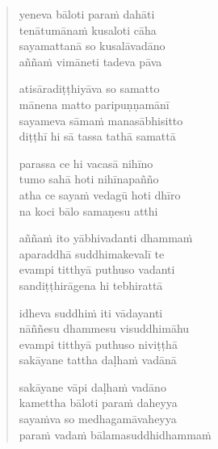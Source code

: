 \clearpage
\begin{verse}

yeneva bāloti paraṁ dahāti\\
tenātumānaṁ kusaloti cāha\\
sayamattanā so kusalāvadāno\\
aññaṁ vimāneti tadeva pāva

atisāradiṭṭhiyāva so samatto\\
mānena matto paripuṇṇamānī\\
sayameva sāmaṁ manasābhisitto\\
diṭṭhī hi sā tassa tathā samattā

parassa ce hi vacasā nihīno\\
tumo sahā hoti nihīnapañño\\
atha ce sayaṁ vedagū hoti dhīro\\
na koci bālo samaṇesu atthi

aññaṁ ito yābhivadanti dhammaṁ\\
aparaddhā suddhimakevalī te\\
evampi titthyā puthuso vadanti\\
sandiṭṭhirāgena hi tebhirattā

idheva suddhiṁ iti vādayanti\\
nāññesu dhammesu visuddhimāhu\\
evampi titthyā puthuso niviṭṭhā\\
sakāyane tattha daḷhaṁ vadānā

sakāyane vāpi daḷhaṁ vadāno\\
kamettha bāloti paraṁ daheyya\\
sayaṁva so medhagamāvaheyya\\
paraṁ vadaṁ bālamasuddhidhammaṁ

\end{verse}


